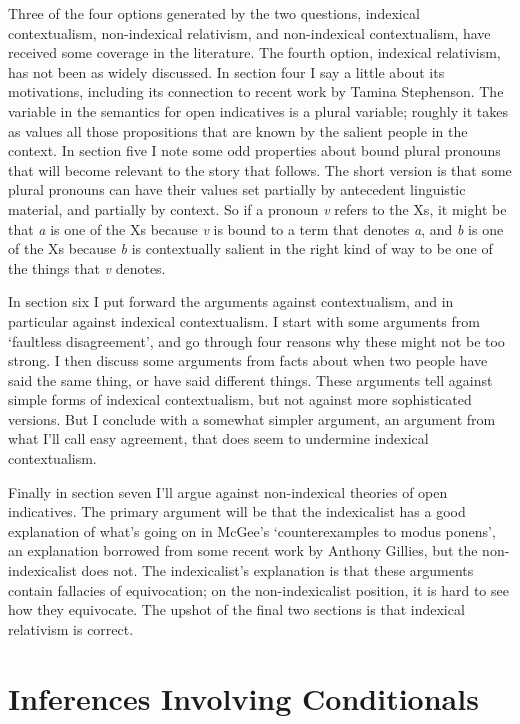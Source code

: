 \documentclass[
  11pt,
  letterpaper,
  DIV=11,
  numbers=noendperiod,
  oneside]{scrartcl}
\begin{document}
Three of the four options generated by the two questions, indexical
contextualism, non-indexical relativism, and non-indexical
contextualism, have received some coverage in the literature. The fourth
option, indexical relativism, has not been as widely discussed. In
section four I say a little about its motivations, including its
connection to recent work by Tamina Stephenson. The variable in the
semantics for open indicatives is a plural variable; roughly it takes as
values all those propositions that are known by the salient people in
the context. In section five I note some odd properties about bound
plural pronouns that will become relevant to the story that follows. The
short version is that some plural pronouns can have their values set
partially by antecedent linguistic material, and partially by context.
So if a pronoun \emph{v} refers to the Xs, it might be that \emph{a} is
one of the Xs because \emph{v} is bound to a term that denotes \emph{a},
and \emph{b} is one of the Xs because \emph{b} is contextually salient
in the right kind of way to be one of the things that \emph{v} denotes.

In section six I put forward the arguments against contextualism, and in
particular against indexical contextualism. I start with some arguments
from `faultless disagreement', and go through four reasons why these
might not be too strong. I then discuss some arguments from facts about
when two people have said the same thing, or have said different things.
These arguments tell against simple forms of indexical contextualism,
but not against more sophisticated versions. But I conclude with a
somewhat simpler argument, an argument from what I'll call easy
agreement, that does seem to undermine indexical contextualism.

Finally in section seven I'll argue against non-indexical theories of
open indicatives. The primary argument will be that the indexicalist has
a good explanation of what's going on in McGee's `counterexamples to
modus ponens', an explanation borrowed from some recent work by Anthony
Gillies, but the non-indexicalist does not. The indexicalist's
explanation is that these arguments contain fallacies of equivocation;
on the non-indexicalist position, it is hard to see how they equivocate.
The upshot of the final two sections is that indexical relativism is
correct.

\section{Inferences Involving
Conditionals}\label{inferences-involving-conditionals}
\end{document}
